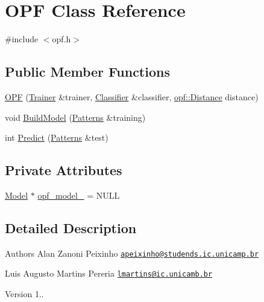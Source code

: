 \hypertarget{classOPF}{\section{O\+P\+F Class Reference}
\label{classOPF}
}


{\ttfamily \#include $<$opf.\+h$>$}

\subsection*{Public Member Functions}
\begin{DoxyCompactItemize}
\item 
\hyperlink{classOPF_a937d755f9ec9d517eead90e06d5ab672}{O\+P\+F} (\hyperlink{classTrainer}{Trainer} \&trainer, \hyperlink{classClassifier}{Classifier} \&classifier, \hyperlink{namespaceopf_a61631393754e0aa6aaeacf0767b2b419}{opf\+::\+Distance} distance)
\item 
void \hyperlink{classOPF_a3008876cfbc3879986126308ca23cc1e}{Build\+Model} (\hyperlink{classPatterns}{Patterns} \&training)
\item 
int \hyperlink{classOPF_a694477ddd6df7bebbd1856cdf7bf3ce1}{Predict} (\hyperlink{classPatterns}{Patterns} \&test)
\end{DoxyCompactItemize}
\subsection*{Private Attributes}
\begin{DoxyCompactItemize}
\item 
\hyperlink{classModel}{Model} $\ast$ \hyperlink{classOPF_a906ed713cbe0d20ffb96d064f4db42c1}{opf\+\_\+model\+\_\+} = N\+U\+L\+L
\end{DoxyCompactItemize}


\subsection{Detailed Description}
\begin{DoxyAuthor}{Authors}
Alan Zanoni Peixinho \href{mailto:apeixinho@studends.ic.unicamp.br}{\tt apeixinho@studends.\+ic.\+unicamp.\+br} 

Luis Augusto Martins Pereria \href{mailto:lmartins@ic.unicamb.br}{\tt lmartins@ic.\+unicamb.\+br} 
\end{DoxyAuthor}
\begin{DoxyVersion}{Version}
1.. 
\end{DoxyVersion}


